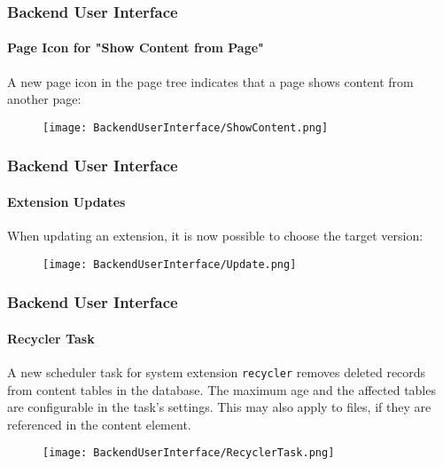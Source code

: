 \begin{frame}[fragile]
	\frametitle{Backend User Interface}
	\framesubtitle{Page Icon for "Show Content from Page"}

	A new page icon in the page tree indicates that a page shows content from another page:

	\begin{figure}
		\texttt{[image: BackendUserInterface/ShowContent.png]}
	\end{figure}

\end{frame}

\begin{frame}[fragile]
	\frametitle{Backend User Interface}
	\framesubtitle{Extension Updates}

	When updating an extension, it is now possible to choose the target version:

	\begin{figure}
		\texttt{[image: BackendUserInterface/Update.png]}
	\end{figure}

\end{frame}

\begin{frame}[fragile]
	\frametitle{Backend User Interface}
	\framesubtitle{Recycler Task}

	A new scheduler task for system extension \texttt{recycler} removes deleted
	records from content tables in the database. The maximum age and the affected
	tables are configurable in the task's settings.
	\newline
	This may also apply to files, if they are referenced in the content element.

	\begin{figure}
		\texttt{[image: BackendUserInterface/RecyclerTask.png]}
	\end{figure}

\end{frame}


